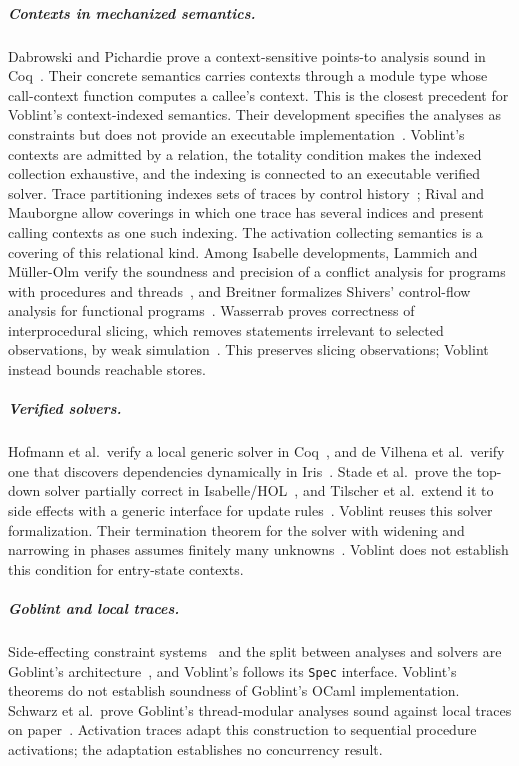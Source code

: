 \subparagraph*{Contexts in mechanized semantics.}
Dabrowski and Pichardie prove a context-sensitive points-to analysis sound
in Coq~\cite{dabrowski09}. Their concrete semantics carries contexts through
a module type whose call-context function computes a callee's context.
This is the closest precedent for Voblint's context-indexed semantics. Their
development specifies the analyses as constraints but does not provide an
executable implementation~\cite[§7]{dabrowski09}. Voblint's
contexts are admitted by a relation, the totality condition makes the indexed
collection exhaustive, and the indexing is connected to an executable verified
solver. Trace partitioning indexes sets of traces by control
history~\cite{rival07}; Rival and Mauborgne allow coverings in which one trace
has several indices and present calling contexts as one such indexing. The
activation collecting semantics is a covering of this relational kind. Among
Isabelle developments, Lammich and Müller-Olm verify the soundness and
precision of a conflict analysis for programs with procedures and
threads~\cite{lammich07afp}, and Breitner formalizes Shivers' control-flow
analysis for functional programs~\cite{breitner10afp}. Wasserrab proves
correctness of interprocedural slicing, which removes statements irrelevant
to selected observations, by weak simulation~\cite{wasserrab09afp}.
This preserves slicing observations; Voblint instead bounds reachable stores.

\subparagraph*{Verified solvers.}
Hofmann et al.\ verify a local generic solver in Coq~\cite{hofmann10}, and de
Vilhena et al.\ verify one that discovers dependencies dynamically in
Iris~\cite{devilhena20}. Stade et al.\ prove the top-down solver partially
correct in Isabelle/HOL~\cite{stade24}, and Tilscher et al.\ extend it to side
effects with a generic interface for update rules~\cite{tilscher26}. Voblint
reuses this solver formalization. Their termination theorem for the solver
with widening and narrowing in phases assumes finitely many
unknowns~\cite{tilscher26jar}. Voblint does not establish this condition
for entry-state contexts.

\subparagraph*{Goblint and local traces.}
Side-effecting constraint systems~\cite{seidl03,apinis12} and the split
between analyses and solvers are Goblint's architecture~\cite{vojdani16,seidl26},
and Voblint's  follows its \texttt{Spec} interface.
Voblint's theorems do not establish soundness of Goblint's OCaml implementation.
Schwarz et al.\ prove
Goblint's thread-modular analyses sound against local traces on
paper~\cite{schwarz21,schwarz23}. Activation traces adapt this construction
to sequential procedure activations; the adaptation establishes no concurrency result.
